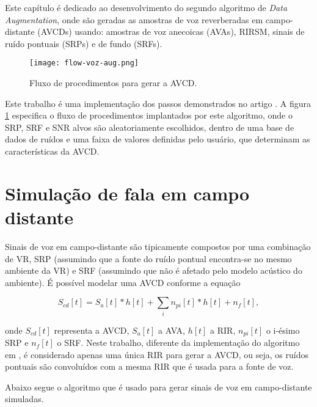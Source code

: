 Este capítulo é dedicado ao desenvolvimento do segundo algoritmo de \textit{Data Augmentation}, onde são geradas as amostras de voz 
reverberadas em campo-distante (AVCDs) usando: amostras de voz anecoicas (AVAs), RIRSM, sinais de ruído pontuais (SRPs) e de fundo (SRFs).

\begin{figure} [H]
    \centering
    \texttt{[image: flow-voz-aug.png]}
    \caption{Fluxo de procedimentos para gerar a AVCD.} 
    \label{fig:flow-voz-rev}
\end{figure}

Este trabalho é uma implementação dos passos demonstrados no artigo \cite{Speech_Rec}. A figura \ref{fig:flow-voz-rev} especifica 
o fluxo de procedimentos implantados por este algoritmo, onde o SRP, SRF e SNR alvos são aleatoriamente escolhidos, 
dentro de uma base de dados de ruídos e uma faixa de valores definidas pelo usuário, que determinam as características da AVCD. 

\section{Simulação de fala em campo distante} 

Sinais de voz em campo-distante são tipicamente compostos por uma combinação de VR, SRP (assumindo que a fonte do ruído pontual encontra-se 
no mesmo ambiente da VR) e SRF (assumindo que não é afetado pelo modelo acústico do ambiente).
É possível modelar uma AVCD conforme a equação

\begin{equation} \label{eqn:AVCD-model}
    S_{cd}[t] = S_a[t] \ast h[t] + \sum_i n_{pi}[t] \ast h[t] + n_f[t]
    ,
\end{equation}

onde $S_{cd}[t]$ representa a AVCD, $S_a[t]$ a AVA, $h[t]$ a RIR, $n_{pi}[t]$ o i-ésimo SRP e $n_f[t]$ o SRF.
Neste trabalho, diferente da implementação do algoritmo em \cite{Speech_Rec}, é considerado apenas uma única RIR
para gerar a AVCD, ou seja, os ruídos pontuais são convoluídos com a mesma RIR que é usada para a fonte de voz.


Abaixo segue o algoritmo que é usado para gerar sinais de voz em campo-distante simuladas. 
\bigbreak
\bigbreak


